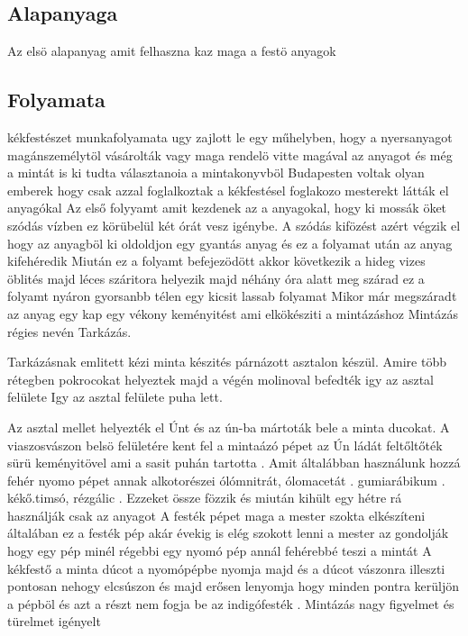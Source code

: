 \documentclass[fontsize=12pt, appendixprefix=true]{scrreprt}
\begin{document}
\subsection{Alapanyaga}
Az elsö alapanyag amit felhaszna kaz maga a festö anyagok 



\subsection{Folyamata}
kékfestészet  munkafolyamata ugy zajlott le egy műhelyben, hogy a nyersanyagot magánszemélytöl vásárolták vagy maga rendelö vitte magával az anyagot és még a mintát is ki tudta választanoia  a mintakonyvböl
Budapesten voltak olyan emberek hogy csak azzal foglalkoztak a kékfestésel foglakozo mesterekt látták el anyagókal
Az első  folyyamt amit kezdenek az a anyagokal, hogy ki mossák öket szódás vízben ez körübelül két órát vesz igénybe.
 A szódás kifözést azért végzik el hogy az anyagböl ki oldoldjon egy gyantás anyag és ez a folyamat után  az anyag kifehéredik
 Miután ez a folyamt befejezödött akkor következik a hideg vizes öblités majd léces száritora helyezik majd néhány óra alatt meg szárad ez a folyamt nyáron gyorsanbb télen egy kicsit lassab folyamat 
Mikor már megszáradt az anyag egy kap egy vékony keményitést ami elkökésziti a mintázáshoz 
Mintázás régies nevén Tarkázás.

Tarkázásnak emlitett kézi minta készités  párnázott asztalon készül.
Amire több rétegben pokrocokat helyeztek majd a végén molinoval befedték igy az asztal felülete 
Igy az asztal felülete puha lett.

Az asztal mellet helyezték el Únt és az ún-ba mártoták bele a minta ducokat.
A viaszosvászon belsö felületére kent fel a mintaázó pépet az Ún 
ládát feltőltőték sürü keményitövel ami a sasit puhán tartotta .
Amit általábban használunk hozzá  fehér nyomo pépet annak alkotorészei ólómnitrát, ólomacetát . gumiarábikum . kékő.timsó, rézgálic .
Ezzeket össze fözzik és miután kihült egy hétre rá használják csak az anyagot 
A festék pépet  maga a mester szokta elkészíteni általában ez a festék pép akár évekig is elég szokott lenni a mester az gondolják hogy egy pép minél régebbi egy nyomó pép annál fehérebbé teszi a mintát
A kékfestő a minta  dúcot a nyomópépbe nyomja majd és a dúcot vászonra illeszti pontosan nehogy elcsúszon és majd erősen lenyomja hogy minden pontra kerüljön a pépböl és azt a részt nem fogja be az indigófesték .
Mintázás nagy figyelmet és türelmet igényelt 
\end{document}
